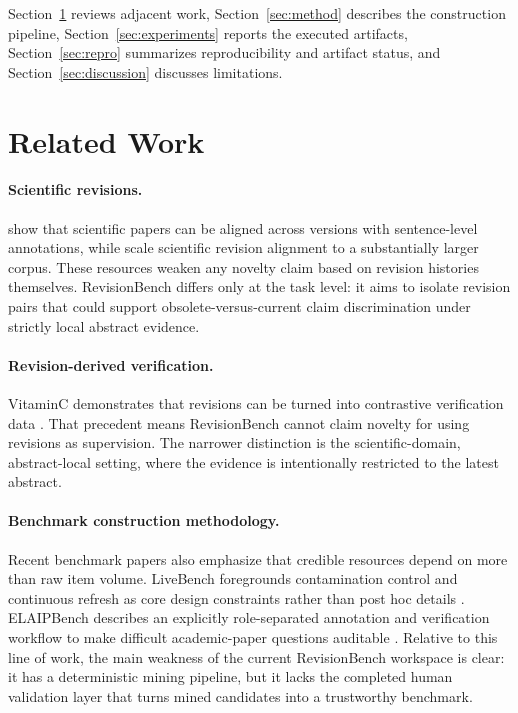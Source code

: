 \documentclass{article}
\begin{document}
Section~\ref{sec:related} reviews adjacent work, Section~\ref{sec:method} describes the construction pipeline, Section~\ref{sec:experiments} reports the executed artifacts, Section~\ref{sec:repro} summarizes reproducibility and artifact status, and Section~\ref{sec:discussion} discusses limitations.

\section{Related Work}
\label{sec:related}

\paragraph{Scientific revisions.}
\citet{jiang-etal-2022-arxivedits} show that scientific papers can be aligned across versions with sentence-level annotations, while \citet{jourdan-etal-2024-casimir} scale scientific revision alignment to a substantially larger corpus. These resources weaken any novelty claim based on revision histories themselves. RevisionBench differs only at the task level: it aims to isolate revision pairs that could support obsolete-versus-current claim discrimination under strictly local abstract evidence.

\paragraph{Revision-derived verification.}
VitaminC demonstrates that revisions can be turned into contrastive verification data \citep{Schuster2021Get}. That precedent means RevisionBench cannot claim novelty for using revisions as supervision. The narrower distinction is the scientific-domain, abstract-local setting, where the evidence is intentionally restricted to the latest abstract.

\paragraph{Benchmark construction methodology.}
Recent benchmark papers also emphasize that credible resources depend on more than raw item volume. LiveBench foregrounds contamination control and continuous refresh as core design constraints rather than post hoc details \citep{White2024LiveBench}. ELAIPBench describes an explicitly role-separated annotation and verification workflow to make difficult academic-paper questions auditable \citep{Dai2025ELAIPBench}. Relative to this line of work, the main weakness of the current RevisionBench workspace is clear: it has a deterministic mining pipeline, but it lacks the completed human validation layer that turns mined candidates into a trustworthy benchmark.
\end{document}
